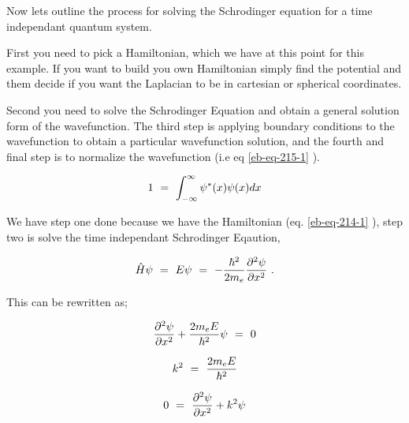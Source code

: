 \documentclass{article}
\begin{document}
Now lets outline the process for solving the Schrodinger equation for a time independant quantum system. 

First you need to pick a Hamiltonian, which we have at this point for this example. If you want to build you own Hamiltonian simply find the potential and them decide if you want the Laplacian to be in cartesian or spherical coordinates.

Second you need to solve the Schrodinger Equation and obtain a general solution form of the wavefunction. The third step is applying boundary conditions to the wavefunction to obtain a particular wavefunction solution, and the fourth and final step is to normalize the wavefunction (i.e eq \ref{eb-eq-215-1} ).

\begin{equation} \label{eb-eq-215-1}
1 \hspace{0.125cm} = \hspace{0.125cm} \int_{-\infty}^{\infty} \psi^\ast(x) \psi(x) dx
\end{equation} 

We have step one done because we have the Hamiltonian (eq. \ref{eb-eq-214-1} ), step two is solve the time independant Schrodinger Eqaution,

\begin{equation} \label{eb-eq-216-1}
\hat{H}\psi \hspace{0.125cm} = \hspace{0.125cm} E\psi  \hspace{0.125cm} = \hspace{0.125cm} -\frac{\hbar^2}{2m_e}\frac{\partial^2{\psi}}{\partial{x^2}} \hspace{0.125cm} .
\end{equation} 

This can be rewritten as; 

\begin{equation} \label{eb-eq-217-1}
\frac{\partial^2{\psi}}{\partial{x^2}} + \frac{2m_e E}{\hbar^2} \psi \hspace{0.125cm} = \hspace{0.125cm} 0  
\end{equation}

\begin{equation} \label{eb-eq-218-1}
k^2 \hspace{0.125cm} = \hspace{0.125cm} \frac{2m_e E}{\hbar^2}
\end{equation}

\begin{equation} \label{eb-eq-219-1}
0 \hspace{0.125cm} = \hspace{0.125cm} \frac{\partial^2{\psi}}{\partial{x^2}} + k^2 \psi  
\end{equation}
\end{document}
